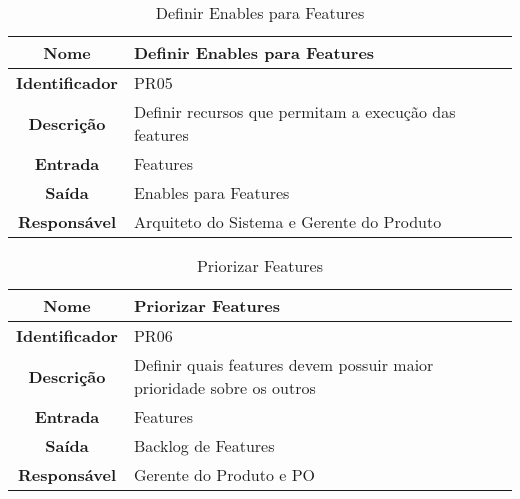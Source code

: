 {              \begin{table}[H]
                \centering
                \caption{Definir Enables para Features}
                \begin{tabular}{c|p{10cm}}
                    \hline
                    \textbf{Nome}            & Definir Enables para Features\\
                    \hline
                    \textbf{Identificador} & PR05\\ 
                    \hline
                    \textbf{Descrição}   & Definir recursos que permitam a execução das features\\ 
                    \hline
                    \textbf{Entrada}           & Features\\
                    \hline
                    \textbf{Saída}            &  Enables para Features\\
                    \hline
                    \textbf{Responsável}            & Arquiteto do Sistema e Gerente do Produto\\
                    \hline                    
                \end{tabular}
            \end{table}

              \begin{table}[H]
                \centering
                \caption{Priorizar Features}
                \begin{tabular}{c|p{10cm}}
                    \hline
                    \textbf{Nome}            & Priorizar Features\\
                    \hline
                    \textbf{Identificador} & PR06\\ 
                    \hline
                    \textbf{Descrição}   & Definir quais features devem possuir maior prioridade sobre os outros\\ 
                    \hline
                    \textbf{Entrada}           & Features\\
                    \hline
                    \textbf{Saída}            &  Backlog de Features\\
                    \hline
                    \textbf{Responsável}            & Gerente do Produto e PO\\
                    \hline                    
                \end{tabular}
            \end{table}

}
